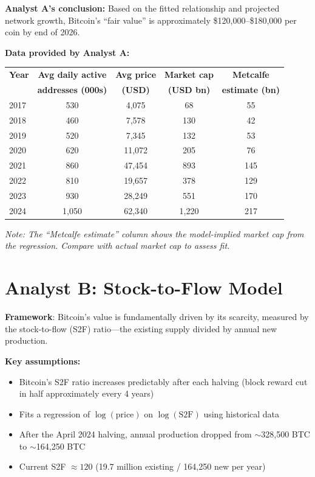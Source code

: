 \documentclass[11pt]{article}
\begin{document}
\medskip
\noindent\textbf{Analyst A's conclusion:} Based on the fitted relationship and projected network growth, Bitcoin's ``fair value'' is approximately \$120,000--\$180,000 per coin by end of 2026.

\medskip
\noindent\textbf{Data provided by Analyst A:}

\begin{center}
\small
\begin{tabular}{lcccc}
\toprule
\textbf{Year} & \textbf{Avg daily active} & \textbf{Avg price} & \textbf{Market cap} & \textbf{Metcalfe} \\
 & \textbf{addresses (000s)} & \textbf{(USD)} & \textbf{(USD bn)} & \textbf{estimate (bn)} \\
\midrule
2017 & 530 & 4,075 & 68 & 55 \\
2018 & 460 & 7,578 & 130 & 42 \\
2019 & 520 & 7,345 & 132 & 53 \\
2020 & 620 & 11,072 & 205 & 76 \\
2021 & 860 & 47,454 & 893 & 145 \\
2022 & 810 & 19,657 & 378 & 129 \\
2023 & 930 & 28,249 & 551 & 170 \\
2024 & 1,050 & 62,340 & 1,220 & 217 \\
\bottomrule
\end{tabular}
\end{center}

\smallskip
\noindent\textit{Note: The ``Metcalfe estimate'' column shows the model-implied market cap from the regression. Compare with actual market cap to assess fit.}

\section*{Analyst B: Stock-to-Flow Model}

\textbf{Framework}: Bitcoin's value is fundamentally driven by its scarcity, measured by the stock-to-flow (S2F) ratio---the existing supply divided by annual new production.

\medskip
\noindent\textbf{Key assumptions:}
\begin{itemize}[leftmargin=*]
\item Bitcoin's S2F ratio increases predictably after each halving (block reward cut in half approximately every 4 years)
\item Fits a regression of $\log(\text{price})$ on $\log(\text{S2F})$ using historical data
\item After the April 2024 halving, annual production dropped from $\sim$328,500 BTC to $\sim$164,250 BTC
\item Current S2F $\approx 120$ (19.7 million existing / 164,250 new per year)
\end{itemize}
\end{document}
